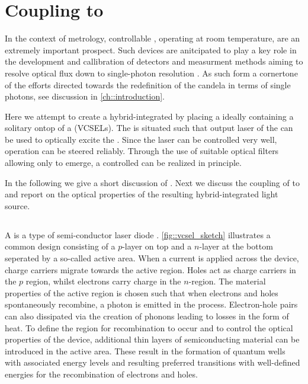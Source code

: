 
\section{Coupling \sivs to \Vcsels} \label{sec::coupling_vcsel}

	In the context of metrology, controllable \spss, operating at room temperature, are an extremely important prospect. Such devices are anitcipated to play a key role in the development and callibration of detectors and measurment methods aiming to resolve optical flux down to single-photon resolution \cite{Vaigu2017}. As such \sps form a cornertone of the efforts directed towards the redefinition of the candela in terms of single photons, see discussion in \autoref{ch::introduction}.

	Here we attempt to create a hybrid-integrated \sps by placing a \nd ideally containing a solitary \sivs ontop of a \vcsels (VCSELs).
	The \siv is situated such that output laser of the \VCSEL can be used to optically excite the \cc. Since the \VCSEL laser can be controlled very well, \siv operation can be steered reliably. Through the use of suitable optical filters allowing only \siv \fl to emerge, a controlled \sps can be realized in principle.

	In the following we give a short discussion of \VCSELs. Next we discuss the coupling of \sivs to \VCSELs and report on the optical properties of the resulting hybrid-integrated light source.

	\subsection{\Vcsels}\label{subsec::vcsel_structure}

		A \vcsel is a type of semi-conductor laser diode \cite{britney::1, britney::6, brintney::7}. \autoref{fig::vcsel_sketch} illustrates a common design consisting of a $p$-layer on top and a $n$-layer at the bottom seperated by a so-called active area. When a current is applied across the device, charge carriers migrate towards the active region. Holes act as charge carriers in the $p$ region, whilst electrons carry charge in the $n$-region. The material properties of the active region is chosen such that when electrons and holes spontaneously recombine, a photon is emitted in the process. Electron-hole pairs can also dissipated via the creation of phonons leading to losses in the form of heat. To define the region for recombination to occur and to control the optical properties of the device, additional thin layers of semiconducting material can be introduced in the active area. These result in the formation of quantum wells with associated energy levels and resulting preferred transitions with well-defined energies for the recombination of electrons and holes.

